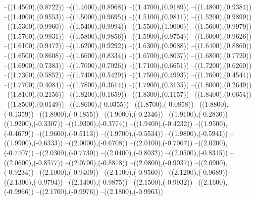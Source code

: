 {	--({\sx*(1.4500)},{\sy*(0.8722)})
	--({\sx*(1.4600)},{\sy*(0.8968)})
	--({\sx*(1.4700)},{\sy*(0.9189)})
	--({\sx*(1.4800)},{\sy*(0.9384)})
	--({\sx*(1.4900)},{\sy*(0.9553)})
	--({\sx*(1.5000)},{\sy*(0.9695)})
	--({\sx*(1.5100)},{\sy*(0.9811)})
	--({\sx*(1.5200)},{\sy*(0.9899)})
	--({\sx*(1.5300)},{\sy*(0.9960)})
	--({\sx*(1.5400)},{\sy*(0.9994)})
	--({\sx*(1.5500)},{\sy*(1.0000)})
	--({\sx*(1.5600)},{\sy*(0.9979)})
	--({\sx*(1.5700)},{\sy*(0.9931)})
	--({\sx*(1.5800)},{\sy*(0.9856)})
	--({\sx*(1.5900)},{\sy*(0.9754)})
	--({\sx*(1.6000)},{\sy*(0.9626)})
	--({\sx*(1.6100)},{\sy*(0.9472)})
	--({\sx*(1.6200)},{\sy*(0.9292)})
	--({\sx*(1.6300)},{\sy*(0.9088)})
	--({\sx*(1.6400)},{\sy*(0.8860)})
	--({\sx*(1.6500)},{\sy*(0.8608)})
	--({\sx*(1.6600)},{\sy*(0.8334)})
	--({\sx*(1.6700)},{\sy*(0.8037)})
	--({\sx*(1.6800)},{\sy*(0.7720)})
	--({\sx*(1.6900)},{\sy*(0.7383)})
	--({\sx*(1.7000)},{\sy*(0.7026)})
	--({\sx*(1.7100)},{\sy*(0.6651)})
	--({\sx*(1.7200)},{\sy*(0.6260)})
	--({\sx*(1.7300)},{\sy*(0.5852)})
	--({\sx*(1.7400)},{\sy*(0.5429)})
	--({\sx*(1.7500)},{\sy*(0.4993)})
	--({\sx*(1.7600)},{\sy*(0.4544)})
	--({\sx*(1.7700)},{\sy*(0.4084)})
	--({\sx*(1.7800)},{\sy*(0.3614)})
	--({\sx*(1.7900)},{\sy*(0.3135)})
	--({\sx*(1.8000)},{\sy*(0.2649)})
	--({\sx*(1.8100)},{\sy*(0.2156)})
	--({\sx*(1.8200)},{\sy*(0.1659)})
	--({\sx*(1.8300)},{\sy*(0.1157)})
	--({\sx*(1.8400)},{\sy*(0.0654)})
	--({\sx*(1.8500)},{\sy*(0.0149)})
	--({\sx*(1.8600)},{\sy*(-0.0355)})
	--({\sx*(1.8700)},{\sy*(-0.0858)})
	--({\sx*(1.8800)},{\sy*(-0.1359)})
	--({\sx*(1.8900)},{\sy*(-0.1855)})
	--({\sx*(1.9000)},{\sy*(-0.2346)})
	--({\sx*(1.9100)},{\sy*(-0.2830)})
	--({\sx*(1.9200)},{\sy*(-0.3307)})
	--({\sx*(1.9300)},{\sy*(-0.3774)})
	--({\sx*(1.9400)},{\sy*(-0.4232)})
	--({\sx*(1.9500)},{\sy*(-0.4679)})
	--({\sx*(1.9600)},{\sy*(-0.5113)})
	--({\sx*(1.9700)},{\sy*(-0.5534)})
	--({\sx*(1.9800)},{\sy*(-0.5941)})
	--({\sx*(1.9900)},{\sy*(-0.6333)})
	--({\sx*(2.0000)},{\sy*(-0.6708)})
	--({\sx*(2.0100)},{\sy*(-0.7067)})
	--({\sx*(2.0200)},{\sy*(-0.7407)})
	--({\sx*(2.0300)},{\sy*(-0.7730)})
	--({\sx*(2.0400)},{\sy*(-0.8032)})
	--({\sx*(2.0500)},{\sy*(-0.8315)})
	--({\sx*(2.0600)},{\sy*(-0.8577)})
	--({\sx*(2.0700)},{\sy*(-0.8818)})
	--({\sx*(2.0800)},{\sy*(-0.9037)})
	--({\sx*(2.0900)},{\sy*(-0.9234)})
	--({\sx*(2.1000)},{\sy*(-0.9409)})
	--({\sx*(2.1100)},{\sy*(-0.9560)})
	--({\sx*(2.1200)},{\sy*(-0.9689)})
	--({\sx*(2.1300)},{\sy*(-0.9794)})
	--({\sx*(2.1400)},{\sy*(-0.9875)})
	--({\sx*(2.1500)},{\sy*(-0.9932)})
	--({\sx*(2.1600)},{\sy*(-0.9966)})
	--({\sx*(2.1700)},{\sy*(-0.9976)})
	--({\sx*(2.1800)},{\sy*(-0.9963)})
}
